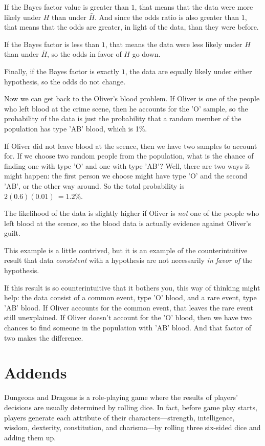 \documentclass[12pt]{book}
\begin{document}
If the Bayes factor value is greater than $1$, that means that the
data were more likely under $H$ than under $\bar{H}$.  And since the
odds ratio is also greater than $1$, that means that the odds are
greater, in light of the data, than they were before.

If the Bayes factor is less than $1$, that means the data were
less likely under $H$ than under $\bar{H}$, so the odds in
favor of $H$ go down.

Finally, if the Bayes factor is exactly $1$, the data are equally
likely under either hypothesis, so the odds do not change.

Now we can get back to the Oliver's blood problem.  If Oliver is
one of the people who left blood at the crime scene, then he
accounts for the 'O' sample, so the probability of the data
is just the probability that a random member of the population
has type 'AB' blood, which is 1\%.

If Oliver did not leave blood at the scence, then we have two
samples to account for.  If we choose two random people from
the population, what is the chance of finding one with type 'O'
and one with type 'AB'?  Well, there are two ways it might happen:
the first person we choose might have type 'O' and the second
'AB', or the other way around.  So the total probability is
$2 (0.6) (0.01)\ = 1.2\%$.

The likelihood of the data is slightly higher if Oliver is
{\it not} one of the people who left blood at the scence, so
the blood data is actually evidence against Oliver's guilt.

This example is a little contrived, but it is an example of
the counterintuitive result that data {\it consistent} with
a hypothesis are not necessarily {\it in favor of}
the hypothesis.

If this result is so counterintuitive that it bothers you,
this way of thinking might help: the data consist of a common
event, type 'O' blood, and a rare event, type 'AB' blood.
If Oliver accounts for the common event, that leaves the rare
event still unexplained.  If Oliver doesn't account for the
'O' blood, then we have two chances to find someone in the
population with 'AB' blood.  And that factor of two makes
the difference.

\section{Addends}
\label{addends}

Dungeons and Dragons is a role-playing game where the results
of players' decisions are usually determined by rolling dice.
In fact, before game play starts, players generate each
attribute of their characters---strength, intelligence, wisdom,
dexterity, constitution, and charisma---by rolling three
six-sided dice and adding them up.
\end{document}
